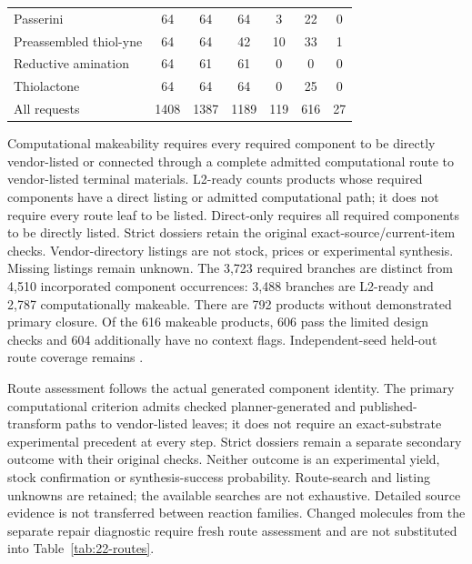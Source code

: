 \begin{table}[H]
\begin{tabular}{@{}>{\raggedright\arraybackslash}p{}cccccc@{}}
Passerini & 64 & 64 & 64 & 3 & 22 & 0 \\
Preassembled thiol-yne & 64 & 64 & 42 & 10 & 33 & 1 \\
Reductive amination & 64 & 61 & 61 & 0 & 0 & 0 \\
Thiolactone & 64 & 64 & 64 & 0 & 25 & 0 \\
\midrule
All requests & 1408 & 1387 & 1189 & 119 & 616 & 27 \\
\bottomrule
\end{tabular}
\par\smallskip\raggedright\scriptsize
Computational makeability requires every required component to be directly vendor-listed or connected through a complete admitted computational route to vendor-listed terminal materials. L2-ready counts products whose required components have a direct listing or admitted computational path; it does not require every route leaf to be listed. Direct-only requires all required components to be directly listed. Strict dossiers retain the original exact-source/current-item checks. Vendor-directory listings are not stock, prices or experimental synthesis. Missing listings remain unknown. The 3,723 required branches are distinct from 4,510 incorporated component occurrences: 3,488 branches are L2-ready and 2,787 computationally makeable. There are 792 products without demonstrated primary closure. Of the 616 makeable products, 606 pass the limited design checks and 604 additionally have no context flags. Independent-seed held-out route coverage remains \PendingCell.
\end{table}

Route assessment follows the actual generated component identity. The primary computational
criterion admits checked planner-generated and published-transform paths to vendor-listed leaves;
it does not require an exact-substrate experimental precedent at every step. Strict dossiers remain
a separate secondary outcome with their original checks. Neither outcome is an experimental yield,
stock confirmation or synthesis-success probability. Route-search and listing unknowns are retained;
the available searches are not exhaustive. Detailed source evidence is not transferred between
reaction families. Changed molecules from the separate repair diagnostic require fresh route
assessment and are not substituted into Table~\ref{tab:22-routes}.

